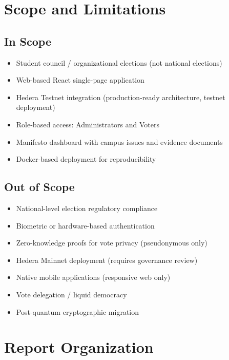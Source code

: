 \section{Scope and Limitations}
\label{sec:scope}

\subsection{In Scope}
\begin{itemize}
    \item Student council / organizational elections (not national elections)
    \item Web-based React single-page application
    \item Hedera Testnet integration (production-ready architecture, testnet deployment)
    \item Role-based access: Administrators and Voters
    \item Manifesto dashboard with campus issues and evidence documents
    \item Docker-based deployment for reproducibility
\end{itemize}

\subsection{Out of Scope}
\begin{itemize}
    \item National-level election regulatory compliance
    \item Biometric or hardware-based authentication
    \item Zero-knowledge proofs for vote privacy (pseudonymous only)
    \item Hedera Mainnet deployment (requires governance review)
    \item Native mobile applications (responsive web only)
    \item Vote delegation / liquid democracy
    \item Post-quantum cryptographic migration
\end{itemize}

\section{Report Organization}
\label{sec:organization}

